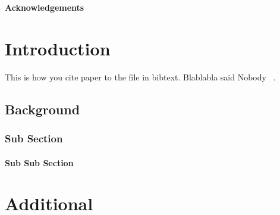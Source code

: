 \documentclass{thesis}
\author{John Doe}                                   %
\date{May 2018}                                     %
\begin{document}
\maketitle
\newpage

% 
% 
\OnehalfSpacing


\begin{abstract}
\blindtext
\end{abstract}

\newpage
\begin{center}
	\textbf{Acknowledgements}
\end{center}

\blindtext

\clearpage


\newpage
\tableofcontents

\newpage
\listoffigures

\newpage
\listoftables



\clearpage



\setcounter{page}{1}

\chapter{Introduction}

\blindtext
This is how you cite paper to the file in bibtext. Blablabla said Nobody ~\cite{Nobody06}.

\section{Background}
\blindtext

\subsection{Sub Section}
\blindtext

\subsubsection{Sub Sub Section}
\blindtext


\appendix

\chapter{Additional}
\blindtext



{}

\end{document}
